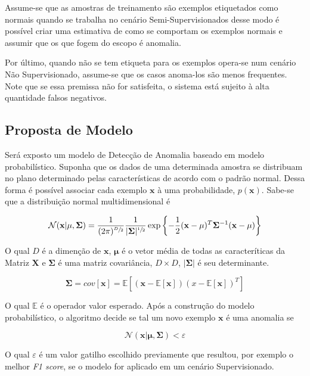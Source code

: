 Assume-se que as amostras de treinamento são exemplos etiquetados como normais quando se trabalha no cenário Semi-Supervisionados desse modo é possível criar uma estimativa de como se comportam os exemplos normais e assumir que os que fogem do escopo é anomalia.

Por último, quando não se tem etiqueta para os exemplos opera-se num cenário Não Supervisionado, assume-se que os casos anoma-los são menos frequentes. Note que se essa premissa não for satisfeita, o sistema está sujeito à alta quantidade falsos negativos.

\subsection{Proposta de Modelo}

Será exposto um modelo de Detecção de Anomalia baseado em modelo probabilístico. Suponha que os dados de uma determinada amostra se distribuam no plano determinado pelas características de acordo com o padrão normal. Dessa forma é possível associar cada exemplo \(\mathbf{x}\) à uma probabilidade, \(p(\mathbf{x})\).
Sabe-se\cite{bishop2006pattern} que a distribuição normal multidimensional é

\[\mathcal{N}(\mathbf{x}|\mathbf{\mu},\mathbf{\Sigma})=\frac{1}{(2\pi)^{\sfrac{D}{2}}} \frac{1}{|\mathbf{\Sigma}|^{\sfrac{1}{2}}}\exp\left\{ -\frac{1}{2} (\mathbf{x} - \mathbf{\mu})^T \mathbf{\Sigma}^{-1} (\mathbf{x} - \mathbf{\mu}) \right\}\]

O qual \(D\) é a dimenção de \(\mathbf{x}\), \(\mathbf{\mu}\) é o vetor média de todas as caracteríticas da Matriz \(\mathbf{X}\) e \(\mathbf{\Sigma}\) é uma matriz covariância, \(D \times D\), \(|\mathbf{\Sigma}|\) é seu determinante.

\[\mathbf{\Sigma}=\mathit{cov}[ \mathbf{x} ] = \mathbb{E} \left \lbrack ( \mathbf{x} - \mathbb{E} [ \mathbf{x} ] ) ( x - \mathbb{E} [ \mathbf{x} ] ) ^ T \right \rbrack \]

O qual \(\mathbb{E}\) é o operador valor esperado. Após a construção do modelo probabilístico, o algoritmo decide se tal um novo exemplo \(\mathbf{x}\) é uma anomalia se

\[\mathcal{N}(\mathbf{x}|\mathbf{\mu},\mathbf{\Sigma}) < \varepsilon\]

O qual \(\varepsilon\) é um valor gatilho escolhido previamente que resultou, por exemplo o melhor \textit{F1 score}, se o modelo for aplicado em um cenário Supervisionado.
